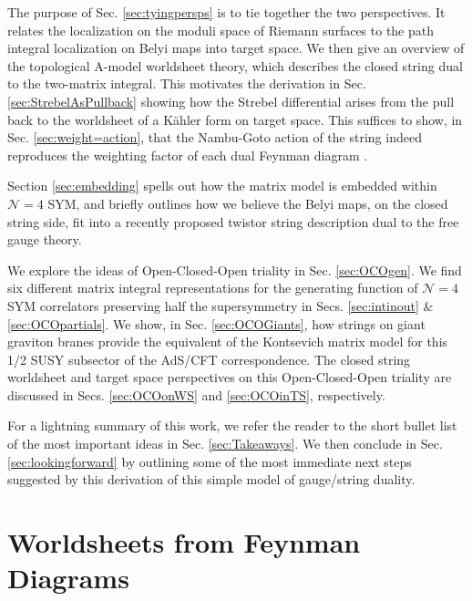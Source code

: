 \documentclass[english]{article}
\renewcommand{\>}{\rangle}
\newcommand{\<}{\langle}
\renewcommand{\(}{\left(}
\renewcommand{\)}{\right)}
\begin{document}
The purpose of Sec. \ref{sec:tyingpersps} is to tie together the two perspectives. It relates the localization on the moduli space of Riemann surfaces to the path integral localization on Belyi maps into target space. We then give an overview of the topological A-model worldsheet theory, which describes the closed string dual to the two-matrix integral. This motivates the derivation in Sec. \ref{sec:StrebelAsPullback} showing how the Strebel differential arises from the pull back to the worldsheet of a Kähler form on target space. This suffices to show, in Sec. \ref{sec:weight=action}, that the Nambu-Goto action of the string indeed reproduces the weighting factor of each dual Feynman diagram . 

Section \ref{sec:embedding} spells out how the matrix model is embedded within $\mathcal{N}=4$ SYM, and briefly outlines how we believe the Belyi maps, on the closed string side, fit into a recently proposed twistor string description dual to the free gauge theory. 

We explore the ideas of Open-Closed-Open triality in Sec. \ref{sec:OCOgen}. We find six different matrix integral representations for the generating function of $\mathcal{N}=4$ SYM correlators preserving half the supersymmetry in Secs. \ref{sec:intinout}  \& \ref{sec:OCOpartials}. We show, in Sec. \ref{sec:OCOGiants}, how strings on giant graviton branes provide the equivalent of the Kontsevich matrix model for this 1/2 SUSY subsector of the AdS/CFT correspondence. The closed string worldsheet and target space perspectives on this Open-Closed-Open triality are discussed in Secs. \ref{sec:OCOonWS} and \ref{sec:OCOinTS}, respectively. 

For a lightning summary of this work, we refer the reader to the short bullet list of the most important ideas in Sec. \ref{sec:Takeaways}. We then conclude in Sec. \ref{sec:lookingforward} by outlining some of the most immediate next steps suggested by this derivation of this simple model of gauge/string duality. 
\pagebreak

\section{Worldsheets from Feynman Diagrams} \label{sec:WSmain}
\end{document}
